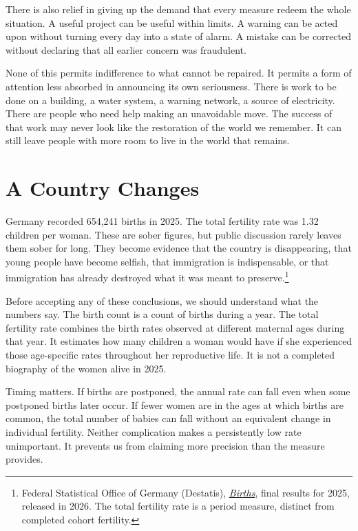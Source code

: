 \documentclass[12pt,a4paper]{book}
\begin{document}
There is also relief in giving up the demand that every measure redeem the whole situation. A useful project can be useful within limits. A warning can be acted upon without turning every day into a state of alarm. A mistake can be corrected without declaring that all earlier concern was fraudulent.

None of this permits indifference to what cannot be repaired. It permits a form of attention less absorbed in announcing its own seriousness. There is work to be done on a building, a water system, a warning network, a source of electricity. There are people who need help making an unavoidable move. The success of that work may never look like the restoration of the world we remember. It can still leave people with more room to live in the world that remains.

\chapter{A Country Changes}

Germany recorded 654,241 births in 2025. The total fertility rate was 1.32 children per woman. These are sober figures, but public discussion rarely leaves them sober for long. They become evidence that the country is disappearing, that young people have become selfish, that immigration is indispensable, or that immigration has already destroyed what it was meant to preserve.\footnote{Federal Statistical Office of Germany (Destatis), \href{https://www.destatis.de/EN/Themes/Society-Environment/Population/Births/_node.html}{\emph{Births}}, final results for 2025, released in 2026. The total fertility rate is a period measure, distinct from completed cohort fertility.}

Before accepting any of these conclusions, we should understand what the numbers say. The birth count is a count of births during a year. The total fertility rate combines the birth rates observed at different maternal ages during that year. It estimates how many children a woman would have if she experienced those age-specific rates throughout her reproductive life. It is not a completed biography of the women alive in 2025.

Timing matters. If births are postponed, the annual rate can fall even when some postponed births later occur. If fewer women are in the ages at which births are common, the total number of babies can fall without an equivalent change in individual fertility. Neither complication makes a persistently low rate unimportant. It prevents us from claiming more precision than the measure provides.
\end{document}

